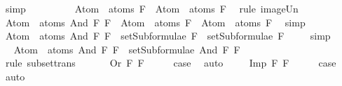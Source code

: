\begin{isabellebody}
\ simp\isanewline
\ \ \ \ \isamarkupfalse%
\ \isamarkupfalse%
\ {\isachardoublequoteopen}{\isachardot}{\isachardot}{\isachardot}\ {\isacharequal}\ Atom\ {\isacharbackquote}\ atoms\ F{}\ {\isasymunion}\ Atom\ {\isacharbackquote}\ atoms\ F{}{\isachardoublequoteclose}\ \isamarkupfalse%
\ {\isacharparenleft}rule\ image{\isacharunderscore}Un{\isacharparenright}\isanewline
\ \ \ \ \isamarkupfalse%
\ \isamarkupfalse%
\ {\isachardoublequoteopen}Atom\ {\isacharbackquote}\ atoms\ {\isacharparenleft}And\ F{}\ F{}{\isacharparenright}\ {\isacharequal}\ Atom\ {\isacharbackquote}\ atoms\ F{}\ {\isasymunion}\ Atom\ {\isacharbackquote}\ atoms\ F{}{\isachardoublequoteclose}\ \isamarkupfalse%
\ simp\isanewline
\ \ \ \ \isamarkupfalse%
\ \isamarkupfalse%
\ {\isachardoublequoteopen}Atom\ {\isacharbackquote}\ atoms\ {\isacharparenleft}And\ F{}\ F{}{\isacharparenright}\ {\isasymsubseteq}\ setSubformulae\ F{}\ {\isasymunion}\ setSubformulae\ F{}{\isachardoublequoteclose}\ \isamarkupfalse%
\ {}\ \isamarkupfalse%
\ simp\isanewline
\ \ \ \ \isamarkupfalse%
\ \isamarkupfalse%
\ {\isachardoublequoteopen}Atom\ {\isacharbackquote}\ atoms\ {\isacharparenleft}And\ F{}\ F{}{\isacharparenright}\ {\isasymsubseteq}\ setSubformulae\ {\isacharparenleft}And\ F{}\ F{}{\isacharparenright}{\isachardoublequoteclose}\ \isamarkupfalse%
\ {}\isanewline
\ \ \ \ \ \ \isamarkupfalse%
\ {\isacharparenleft}rule\ subset{\isacharunderscore}trans{\isacharparenright}\isanewline
\ \ \isamarkupfalse%
\isanewline
{}\isamarkupfalse%
\isanewline
\ \ \isamarkupfalse%
\ {\isacharparenleft}Or\ F{}\ F{}{\isacharparenright}\isanewline
\ \ \isamarkupfalse%
\ \isamarkupfalse%
\ {\isacharquery}case\ \isamarkupfalse%
\ auto\ \isanewline
{}\isamarkupfalse%
\isanewline
\ \ \isamarkupfalse%
\ {\isacharparenleft}Imp\ F{}\ F{}{\isacharparenright}\isanewline
\ \ \isamarkupfalse%
\ \isamarkupfalse%
\ {\isacharquery}case\ \isamarkupfalse%
\ auto\isanewline
{}\isamarkupfalse%
%
\endisatagproof

\end{isabellebody}
